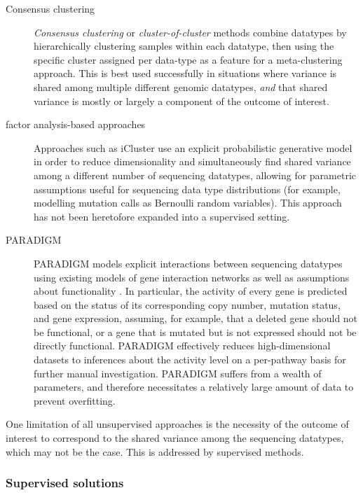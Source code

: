 \begin{description}
\item[Consensus clustering]
  \textit{Consensus clustering} or \textit{cluster-of-cluster} \cite{kristensen_principles_2014-1} methods combine datatypes by hierarchically clustering samples within each datatype, then using the specific cluster assigned per data-type as a feature for a meta-clustering approach. This is best used successfully in situations where variance is shared among multiple different genomic datatypes, \textit{and} that shared variance is mostly or largely a component of the outcome of interest.

\item[factor analysis-based approaches] Approaches such as iCluster \cite{shen_integrative_2012}\cite{shen_integrative_2009} use an explicit probabilistic generative model in order to reduce dimensionality and simultaneously find shared variance among a different number of sequencing datatypes, allowing for parametric assumptions useful for sequencing data type distributions (for example, modelling mutation calls as Bernoulli random variables). This approach has not been heretofore expanded into a supervised setting.

  
\item[PARADIGM]
  PARADIGM models explicit interactions between sequencing datatypes using existing models of gene interaction networks as well as assumptions about functionality \cite{vaske_inference_2010} \cite{ng_paradigm-shift_2012}. In particular, the activity of every gene is predicted based on the status of its corresponding copy number, mutation status, and gene expression, assuming, for example, that a deleted gene should not be functional, or a gene that is mutated but is not expressed should not be directly functional.
  PARADIGM effectively reduces high-dimensional datasets to inferences about the activity level on a per-pathway basis for further manual investigation. 
  PARADIGM suffers from a wealth of parameters, and therefore necessitates a relatively large amount of data to prevent overfitting.   
\end{description}

One limitation of all unsupervised approaches is the necessity of the outcome of interest to correspond to the shared variance among the sequencing datatypes, which may not be the case. This is addressed by supervised methods. 



\subsubsection{Supervised solutions}


